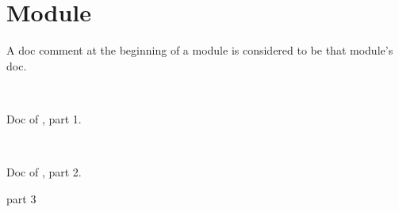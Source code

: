 \section{Module }\label{container-page-test-module-Toplevel+u+comments}%
A doc comment at the beginning of a module is considered to be that module's doc.

\label{container-page-test-module-Toplevel+u+comments-module-type-T}\begin{ocamlindent}\label{container-page-test-module-Toplevel+u+comments-module-type-T-type-t}\\
\end{ocamlindent}%
\begin{ocamlindent}Doc of , part 1.\end{ocamlindent}%
\medbreak
\label{container-page-test-module-Toplevel+u+comments-module-Include+u+inline}\begin{ocamlindent} \hyperref[container-page-test-module-Toplevel+u+comments-module-type-T]{}\label{container-page-test-module-Toplevel+u+comments-module-Include+u+inline-type-t}\\
\end{ocamlindent}%
\begin{ocamlindent}Doc of , part 2.\end{ocamlindent}%
\medbreak
\label{container-page-test-module-Toplevel+u+comments-module-Include+u+inline'}\begin{ocamlindent}part 3 \hyperref[container-page-test-module-Toplevel+u+comments-module-type-T]{}\label{container-page-test-module-Toplevel+u+comments-module-Include+u+inline'-type-t}\\
\end{ocamlindent}%
